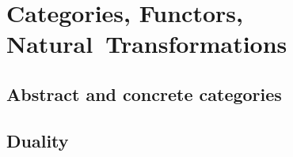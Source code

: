 \chapter{Categories, Functors, Natural~Transformations}

\section{Abstract and concrete categories}




\section{Duality}






